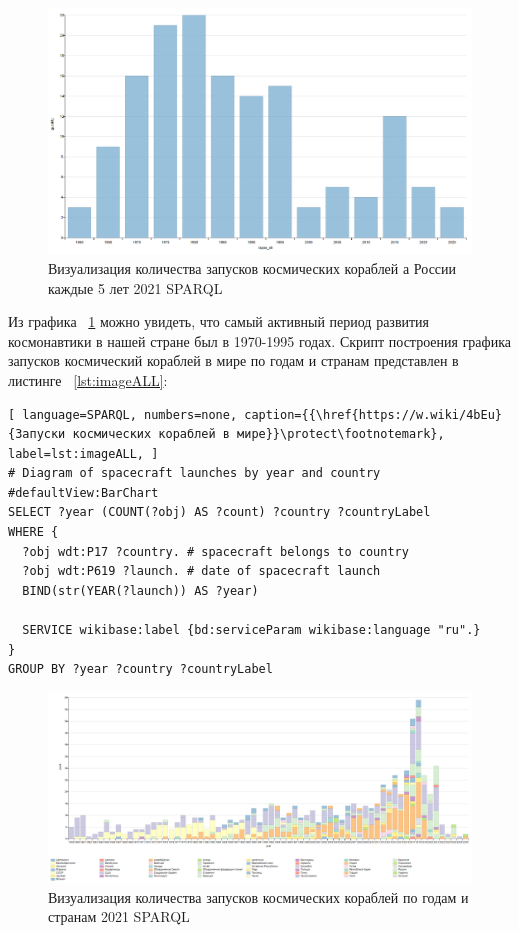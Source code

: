 \begin{figure}[h!]
  \includegraphics[width=\linewidth]{graphics/chapter/spacecraft_space_station/ImgRU.png}
  \caption[График Россия]{Визуализация количества запусков космических кораблей а России каждые 5 лет 2021 SPARQL}%
  \label{fig:ImageRU5}%
\end{figure}

Из графика ~\ref{fig:ImageRU5} можно увидеть, что самый активный период развития космонавтики в нашей стране был в 1970-1995 годах.
Скрипт построения графика запусков космический кораблей в мире по годам и странам представлен в листинге ~\ref{lst:imageALL}:
\begin{lstlisting}[ language=SPARQL, numbers=none, caption={{\href{https://w.wiki/4bEu}{Запуски космических кораблей в мире}}\protect\footnotemark}, label=lst:imageALL, ]
# Diagram of spacecraft launches by year and country
#defaultView:BarChart
SELECT ?year (COUNT(?obj) AS ?count) ?country ?countryLabel
WHERE {
  ?obj wdt:P17 ?country. # spacecraft belongs to country 
  ?obj wdt:P619 ?launch. # date of spacecraft launch
  BIND(str(YEAR(?launch)) AS ?year)
  
  SERVICE wikibase:label {bd:serviceParam wikibase:language "ru".}
}
GROUP BY ?year ?country ?countryLabel
\end{lstlisting}

\begin{figure}[h!]
  \includegraphics[width=\linewidth]{graphics/chapter/spacecraft_space_station/Visualization of the number of spacecraft launches by year and country 2021.png}
  \caption[График мир]{Визуализация количества запусков космических кораблей по годам и странам 2021 SPARQL}%
  \label{fig:ImgALL}%
\end{figure}

